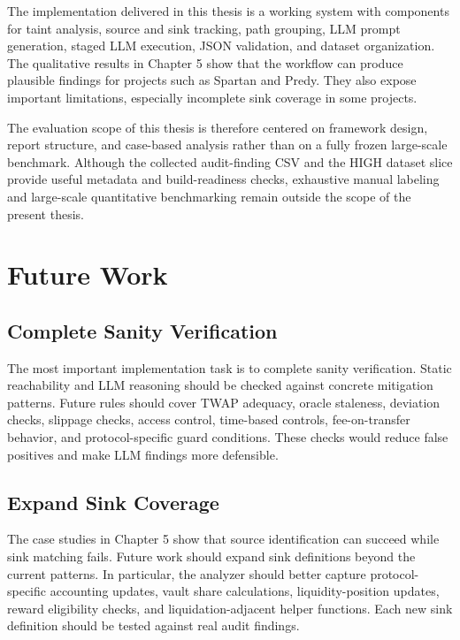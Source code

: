 The implementation delivered in this thesis is a working system with
components for taint analysis, source and sink tracking, path grouping, LLM
prompt generation, staged LLM execution, JSON validation, and dataset
organization. The qualitative results in Chapter 5 show that the workflow can
produce plausible findings for projects such as Spartan and Predy. They also
expose important limitations, especially incomplete sink coverage in some
projects.

The evaluation scope of this thesis is therefore centered on framework design,
report structure, and case-based analysis rather than on a fully frozen
large-scale benchmark. Although the collected audit-finding CSV and the HIGH
dataset slice provide useful metadata and build-readiness checks, exhaustive
manual labeling and large-scale quantitative benchmarking remain outside the
scope of the present thesis.

\section{Future Work}

\subsection{Complete Sanity Verification}

The most important implementation task is to complete sanity verification.
Static reachability and LLM reasoning should be checked against concrete
mitigation patterns. Future rules should cover TWAP adequacy, oracle staleness,
deviation checks, slippage checks, access control, time-based controls,
fee-on-transfer behavior, and protocol-specific guard conditions. These checks
would reduce false positives and make LLM findings more defensible.

\subsection{Expand Sink Coverage}

The case studies in Chapter 5 show that source identification can succeed while
sink matching fails. Future work should expand sink definitions beyond the
current
patterns. In particular, the analyzer should better capture protocol-specific
accounting updates, vault share calculations, liquidity-position updates,
reward eligibility checks, and liquidation-adjacent helper functions. Each new
sink definition should be tested against real audit findings.

